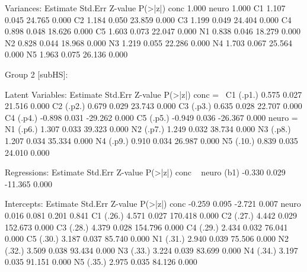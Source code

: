 \begin{Schunk}
\begin{Soutput}
Variances:
                   Estimate  Std.Err  Z-value  P(>|z|)
    conc              1.000                           
    neuro             1.000                           
    C1                1.107    0.045   24.765    0.000
    C2                1.184    0.050   23.859    0.000
    C3                1.199    0.049   24.404    0.000
    C4                0.898    0.048   18.626    0.000
    C5                1.603    0.073   22.047    0.000
    N1                0.838    0.046   18.279    0.000
    N2                0.828    0.044   18.968    0.000
    N3                1.219    0.055   22.286    0.000
    N4                1.703    0.067   25.564    0.000
    N5                1.963    0.075   26.136    0.000


Group 2 [subHS]:

Latent Variables:
                   Estimate  Std.Err  Z-value  P(>|z|)
  conc =~                                             
    C1      (.p1.)    0.575    0.027   21.516    0.000
    C2      (.p2.)    0.679    0.029   23.743    0.000
    C3      (.p3.)    0.635    0.028   22.707    0.000
    C4      (.p4.)   -0.898    0.031  -29.262    0.000
    C5      (.p5.)   -0.949    0.036  -26.367    0.000
  neuro =~                                            
    N1      (.p6.)    1.307    0.033   39.323    0.000
    N2      (.p7.)    1.249    0.032   38.734    0.000
    N3      (.p8.)    1.207    0.034   35.334    0.000
    N4      (.p9.)    0.910    0.034   26.987    0.000
    N5      (.10.)    0.839    0.035   24.010    0.000

Regressions:
                   Estimate  Std.Err  Z-value  P(>|z|)
  conc ~                                              
    neuro     (b1)   -0.330    0.029  -11.365    0.000

Intercepts:
                   Estimate  Std.Err  Z-value  P(>|z|)
    conc             -0.259    0.095   -2.721    0.007
    neuro             0.016    0.081    0.201    0.841
    C1      (.26.)    4.571    0.027  170.418    0.000
    C2      (.27.)    4.442    0.029  152.673    0.000
    C3      (.28.)    4.379    0.028  154.796    0.000
    C4      (.29.)    2.434    0.032   76.041    0.000
    C5      (.30.)    3.187    0.037   85.740    0.000
    N1      (.31.)    2.940    0.039   75.506    0.000
    N2      (.32.)    3.509    0.038   93.434    0.000
    N3      (.33.)    3.224    0.039   83.699    0.000
    N4      (.34.)    3.197    0.035   91.151    0.000
    N5      (.35.)    2.975    0.035   84.126    0.000


\end{Soutput}
\end{Schunk}
